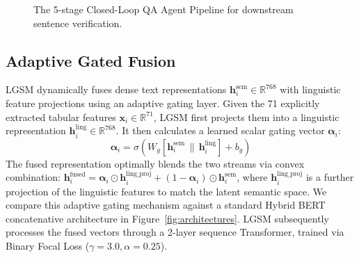\documentclass[11pt,a4paper,twocolumn]{article}
\begin{document}
\begin{figure}[htbp]
\centering
{}
\caption{The 5-stage Closed-Loop QA Agent Pipeline for downstream sentence verification.}
\label{fig:qa_workflow}
\end{figure}

\subsection{Adaptive Gated Fusion}
LGSM dynamically fuses dense text representations $\mathbf{h}_i^{\text{sem}} \in \mathbb{R}^{768}$ with linguistic feature projections using an adaptive gating layer. Given the 71 explicitly extracted tabular features $\mathbf{x}_i \in \mathbb{R}^{71}$, LGSM first projects them into a linguistic representation $\mathbf{h}_i^{\text{ling}} \in \mathbb{R}^{768}$. It then calculates a learned scalar gating vector $\boldsymbol{\alpha}_i$:
\begin{equation}
\boldsymbol{\alpha}_i = \sigma(W_g [\mathbf{h}_i^{\text{sem}} \,\|\, \mathbf{h}_i^{\text{ling}}] + b_g)
\end{equation}
The fused representation optimally blends the two streams via convex combination: $\mathbf{h}^{\text{fused}}_i = \boldsymbol{\alpha}_i \odot \mathbf{h}^{\text{ling\_proj}}_i + (1 - \boldsymbol{\alpha}_i) \odot \mathbf{h}^{\text{sem}}_i$, where $\mathbf{h}^{\text{ling\_proj}}_i$ is a further projection of the linguistic features to match the latent semantic space. We compare this adaptive gating mechanism against a standard Hybrid BERT concatenative architecture in Figure~\ref{fig:architectures}. LGSM subsequently processes the fused vectors through a 2-layer sequence Transformer, trained via Binary Focal Loss ($\gamma = 3.0, \alpha = 0.25$).
\end{document}
